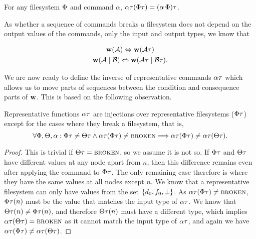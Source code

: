 \begin{mycor}
For any filesystem $\Phi$ and command $\alpha$, 
$\alpha\tau(\Phi\tau) = (\alpha\,\Phi)\tau$.
\end{mycor}


As whether a sequence of commands breaks a filesystem does not depend on the output values
of the commands, only the input and output types, we know that
\begin{mycor}
\begin{gather*}
\mathbf{w}({\mathcal{A}}) \Leftrightarrow \mathbf{w}({\mathcal{A}\tau}) \\
\mathbf{w}({\mathcal{A}}\mathrel{|}{\mathcal{B}}) \Leftrightarrow \mathbf{w}({\mathcal{A}\tau}\mathrel{|}{\mathcal{B}\tau}).
\end{gather*}
\end{mycor}


We are now ready to define the inverse of representative commands $\alpha\tau$
which allows us to move parts of sequences between the
condition and consequence parts of $\mathbf{w}$.
This is based on the following observation.

\begin{mylem}
Representative functions $\alpha\tau$ are injections over representative filesystems ($\Phi\tau$)
except for the cases where they break a filesystem, that is,
\[ \forall\Phi,\Theta,\alpha: \Phi\tau\neq\Theta\tau \wedge \alpha\tau(\Phi\tau)\neq\text{\normalfont\scshape{broken}} \Longrightarrow \alpha\tau(\Phi\tau) \neq \alpha\tau(\Theta\tau). \]
\end{mylem}
\begin{proof}
This is trivial if $\Theta\tau=\text{\normalfont\scshape{broken}}$, so we assume it is not so.
If $\Phi\tau$ and $\Theta\tau$ have different values at any node apart from $n$, then this difference remains
even after applying the command to $\Phi\tau$. The only remaining case therefore is where they have the same values
at all nodes except $n$.
We know that a representative filesystem can only have values from the set $\{d_0,f_0,\bot\}$.
As $\alpha\tau(\Phi\tau)\neq\text{\normalfont\scshape{broken}}$, $\Phi\tau(n)$ must be the value that matches the input type of $\alpha\tau$.
We know that $\Theta\tau(n)\neq\Phi\tau(n)$, and therefore $\Theta\tau(n)$ must have a different type,
which implies $\alpha\tau(\Theta\tau)=\text{\normalfont\scshape{broken}}$ as it cannot match the input type of $\alpha\tau$,
and again we have $\alpha\tau(\Phi\tau) \neq \alpha\tau(\Theta\tau)$.
\end{proof}

